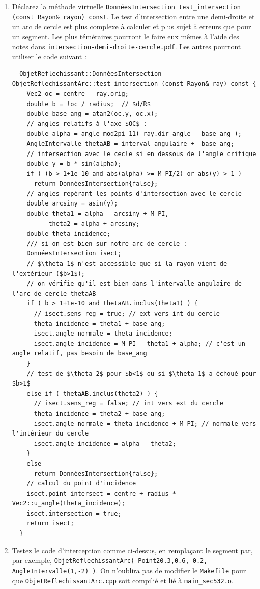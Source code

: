 \documentclass{book}
\newcommand{\inline}[1]{\texttt{#1}}
\def\filename{\texttt}
\begin{document}
\begin{enumerate}
  \item Déclarez la méthode virtuelle \inline{DonnéesIntersection test_intersection (const Rayon& rayon) const}. Le test d'intersection entre une demi-droite et un arc de cercle est plus complexe à calculer et plus sujet à erreurs que pour un segment. Les plus téméraires pourront le faire eux mêmes à l'aide des notes dans \filename{intersection-demi-droite-cercle.pdf}. Les autres pourront utiliser le code suivant :
  \begin{verbatim}
  ObjetReflechissant::DonnéesIntersection ObjetReflechissantArc::test_intersection (const Rayon& ray) const {
    Vec2 oc = centre - ray.orig;
    double b = !oc / radius;  // $d/R$
    double base_ang = atan2(oc.y, oc.x);
    // angles relatifs à l'axe $OC$ :
    double alpha = angle_mod2pi_11( ray.dir_angle - base_ang );
    AngleIntervalle thetaAB = interval_angulaire + -base_ang;
    // intersection avec le cecle si en dessous de l'angle critique
    double y = b * sin(alpha);
    if ( (b > 1+1e-10 and abs(alpha) >= M_PI/2) or abs(y) > 1 )
      return DonnéesIntersection{false};
    // angles repérant les points d'intersection avec le cercle
    double arcsiny = asin(y);
    double theta1 = alpha - arcsiny + M_PI,
          theta2 = alpha + arcsiny;
    double theta_incidence;
    /// si on est bien sur notre arc de cercle :
    DonnéesIntersection isect;
    // $\theta_1$ n'est accessible que si la rayon vient de l'extérieur ($b>1$);
    // on vérifie qu'il est bien dans l'intervalle angulaire de l'arc de cercle thetaAB
    if ( b > 1+1e-10 and thetaAB.inclus(theta1) ) {
      // isect.sens_reg = true; // ext vers int du cercle
      theta_incidence = theta1 + base_ang;
      isect.angle_normale = theta_incidence;
      isect.angle_incidence = M_PI - theta1 + alpha; // c'est un angle relatif, pas besoin de base_ang
    }
    // test de $\theta_2$ pour $b<1$ ou si $\theta_1$ a échoué pour $b>1$
    else if ( thetaAB.inclus(theta2) ) {
      // isect.sens_reg = false; // int vers ext du cercle
      theta_incidence = theta2 + base_ang;
      isect.angle_normale = theta_incidence + M_PI; // normale vers l'intérieur du cercle
      isect.angle_incidence = alpha - theta2;
    }
    else
      return DonnéesIntersection{false};
    // calcul du point d'incidence
    isect.point_intersect = centre + radius * Vec2::u_angle(theta_incidence);
    isect.intersection = true;
    return isect;
  }
  \end{verbatim}

  \item Testez le code d'interception comme ci-dessus, en remplaçant le segment par, par exemple, \inline{ObjetReflechissantArc( Point2{0.3,0.6}, 0.2, AngleIntervalle(1,-2) )}. On n'oublira pas de modifier le \filename{Makefile} pour que \filename{ObjetReflechissantArc.cpp} soit compilié et lié à \filename{main\_sec532.o}.

\end{enumerate}
\end{document}
